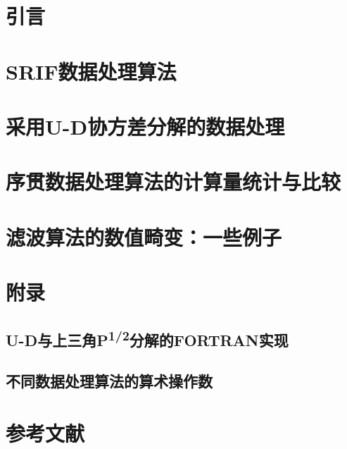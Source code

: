 \documentclass[./book.tex]{subfiles}
\begin{document}
\section{引言}

\section{SRIF数据处理算法}

\section{采用U-D协方差分解的数据处理}

\section{序贯数据处理算法的计算量统计与比较}

\section{滤波算法的数值畸变：一些例子}

\section{附录}

\subsection{U-D与上三角\texorpdfstring{P\textsuperscript{1/2}}{P\^{}1/2}分解的FORTRAN实现}

\subsection{不同数据处理算法的算术操作数}

\section{参考文献}
\end{document}
